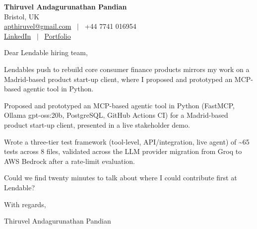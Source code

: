 \documentclass[11pt,a4paper]{article}
\begin{document}
\raggedright
\pagestyle{empty}

\begin{center}
    {\LARGE \color{linkblue} \textbf{Thiruvel Andagurunathan Pandian}}\\[0.2cm]
    Bristol, UK \\
    \href{mailto:apthiruvel@gmail.com}{apthiruvel@gmail.com} \ $|$ \ +44 7741 016954 \\
\href{https://www.linkedin.com/in/thiruvel-a-p/}{LinkedIn} \ $|$ \ \href{https://thiruvel-ap.github.io/PersonalPortfolio/}{Portfolio}
\end{center}

\vspace{0.4cm}

\noindent
Dear Lendable hiring team,

Lendable\textquotesingle{}s push to rebuild core consumer finance products mirrors my work on a Madrid-based product start-up client, where I proposed and prototyped an MCP-based agentic tool in Python.

Proposed and prototyped an MCP-based agentic tool in Python (FastMCP, Ollama gpt-oss:20b, PostgreSQL, GitHub Actions CI) for a Madrid-based product start-up client, presented in a live stakeholder demo.

Wrote a three-tier test framework (tool-level, API/integration, live agent) of \textasciitilde{}65 tests across 8 files, validated across the LLM provider migration from Groq to AWS Bedrock after a rate-limit evaluation.

Could we find twenty minutes to talk about where I could contribute first at Lendable?

\vspace{0.5cm}

With regards,

Thiruvel Andagurunathan Pandian
\end{document}

